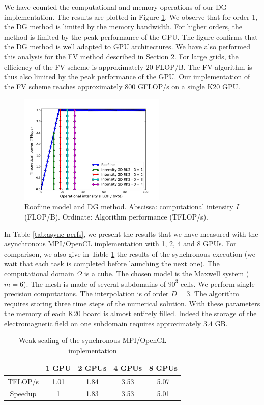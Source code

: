 \documentclass[12pt]{amsart}
\begin{document}
We have counted the computational and memory operations of our DG implementation. The results are plotted in Figure \ref{fig:roofline}. We observe that for order 1, the DG method is limited by the memory bandwidth.  For higher orders, the method is limited by the peak performance of the GPU. The figure confirms that the DG method is well adapted to GPU architectures.
We have also performed this analysis for the FV method described in Section 2. For large grids, the efficiency of the FV scheme is approximately $20$ FLOP/B. The FV algorithm is thus also limited by the peak performance of the GPU. Our implementation of the FV scheme reaches approximately $800$ GFLOP/s on a single K20 GPU. 

\begin{figure}[h]
  \centering
\includegraphics[width=7cm]{roof_line_clac2}
  \caption{Roofline model and DG method. Abscissa: computational intensity $I$ (FLOP/B). Ordinate: Algorithm performance (TFLOP/s). \label{fig:roofline}}
\end{figure}

In Table \ref{tab:async-perfs}, we present the results that we have measured with the asynchronous MPI/OpenCL implementation with 1, 2, 4 and 8 GPUs. For comparison, we also give in Table \ref{tab:sync-perfs} the results of the synchronous execution (we wait that each task is completed before launching the next one). The computational domain $\Omega$ is a cube. The chosen model is the Maxwell system ($m=6$). The mesh is made of several subdomains of $90^3$ cells. We perform single precision computations. The interpolation is of order $D=3$. The algorithm requires storing three time steps of the numerical solution. With these parameters the memory of each K20 board is almost entirely filled. Indeed the storage of the electromagnetic field on one subdomain requires approximately $3.4$ GB.

\begin{table}[htdp]
\begin{center}
\begin{tabular}{|c|c|c|c|c|}
\hline
 & 1 GPU & 2 GPUs & 4 GPUs & 8 GPUs\tabularnewline
\hline
\hline
TFLOP/s & 1.01 & 1.84 & 3.53 & 5.07\tabularnewline
\hline
Speedup & 1 & 1.83 & 3.53 & 5.01\tabularnewline
\hline
\end{tabular}
\end{center}
\caption{Weak scaling of the synchronous MPI/OpenCL implementation \label{tab:sync-perfs}}
\end{table}%
\end{document}
